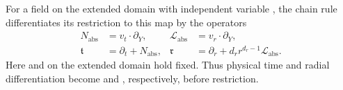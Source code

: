 For a field on the extended domain with independent variable , the chain rule differentiates its restriction to this map by the operators
\begin{equation}
\begin{aligned}
 N_{\mathrm{abs}}&=v_t\mathbin\cdot\partial_Y,
 &\mathcal L_{\mathrm{abs}}&=v_r\mathbin\cdot\partial_Y,\\
 \mathfrak t&=\partial_t+N_{\mathrm{abs}},
 &\mathfrak r&=\partial_r+d_rr^{d_r-1}\mathcal L_{\mathrm{abs}}.
\end{aligned}
\tag{6.4}\label{eq:6.4}
\end{equation}
Here  and  on the extended domain hold  fixed. Thus physical time and radial differentiation become  and , respectively, before restriction.

